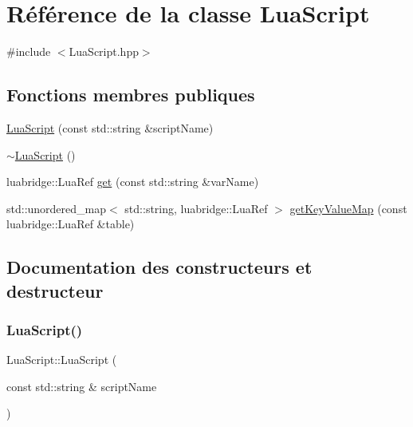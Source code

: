 \hypertarget{classLuaScript}{}\section{Référence de la classe Lua\+Script}
\label{classLuaScript}


{\ttfamily \#include $<$Lua\+Script.\+hpp$>$}

\subsection*{Fonctions membres publiques}
\begin{DoxyCompactItemize}
\item 
\hyperlink{classLuaScript_afc0b4a31427c3c78a8529cf3cf6b729e}{Lua\+Script} (const std\+::string \&script\+Name)
\item 
\hyperlink{classLuaScript_a5660ae45ebd4b7a621ae21a2ed0e784b}{$\sim$\+Lua\+Script} ()
\item 
luabridge\+::\+Lua\+Ref \hyperlink{classLuaScript_a7f5b82c910622d8096ece13da5cd85d5}{get} (const std\+::string \&var\+Name)
\item 
std\+::unordered\+\_\+map$<$ std\+::string, luabridge\+::\+Lua\+Ref $>$ \hyperlink{classLuaScript_a05bcad381dac15ea1b5399045651497d}{get\+Key\+Value\+Map} (const luabridge\+::\+Lua\+Ref \&table)
\end{DoxyCompactItemize}


\subsection{Documentation des constructeurs et destructeur}
\mbox{\label{classLuaScript_afc0b4a31427c3c78a8529cf3cf6b729e}} 
\subsubsection{\texorpdfstring{Lua\+Script()}{LuaScript()}}
{\footnotesize\ttfamily Lua\+Script\+::\+Lua\+Script (\begin{DoxyParamCaption}\item[{const std\+::string \&}]{script\+Name }\end{DoxyParamCaption})}

\mbox{\label{classLuaScript_a5660ae45ebd4b7a621ae21a2ed0e784b}} 
